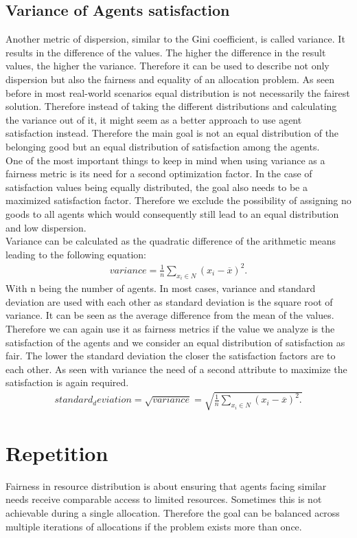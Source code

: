 \documentclass[german, a4paper, 11pt, oneside]{scrbook}
\begin{document}
\subsection{Variance of Agents satisfaction}
Another metric of dispersion, similar to the Gini coefficient, is called variance. It results in the difference of the values.  The higher the difference in the result values, the higher the variance. Therefore it can be used to describe not only dispersion but also the fairness and equality of an allocation problem. As seen before in most real-world scenarios equal distribution is not necessarily the fairest solution. Therefore instead of taking the different distributions and calculating the variance out of it, it might seem as a better approach to use agent satisfaction instead. Therefore the main goal is not an equal distribution of the belonging good but an equal distribution of satisfaction among the agents. \\One of the most important things to keep in mind when using variance as a fairness metric is its need for a second optimization factor. In the case of satisfaction values being equally distributed, the goal also needs to be a maximized satisfaction factor. Therefore we exclude the possibility of assigning no goods to all agents which would consequently still lead to an equal distribution and low dispersion. \\Variance can be calculated as the quadratic difference of the arithmetic means leading to the following equation:
\begin{align}
variance=\frac{1}{n}\sum\limits_{x_i\in N} (x_i-\overline{x})^2.
\end{align}
With n being the number of agents. In most cases, variance and standard deviation are used with each other as standard deviation is the square root of variance. It can be seen as the average difference from the mean of the values. Therefore we can again use it as fairness metrics if the value we analyze is the satisfaction of the agents and we consider an equal distribution of satisfaction as fair. The lower the standard deviation the closer the satisfaction factors are to each other. As seen with variance the need of a second attribute to maximize the satisfaction is again required.
\begin{align}
standard_deviation=\sqrt{variance}=\sqrt{\frac{1}{n}\sum\limits_{x_i\in N} (x_i-\overline{x})^2.}
\end{align}
\cite{ALEXANDERJOHANPHILIPPEEK.2022}


\section{Repetition}
Fairness in resource distribution is about ensuring that agents facing similar needs receive comparable access to limited resources. Sometimes this is not achievable during a single allocation. Therefore the goal can be balanced across multiple iterations of allocations if the problem exists more than once.
\end{document}
